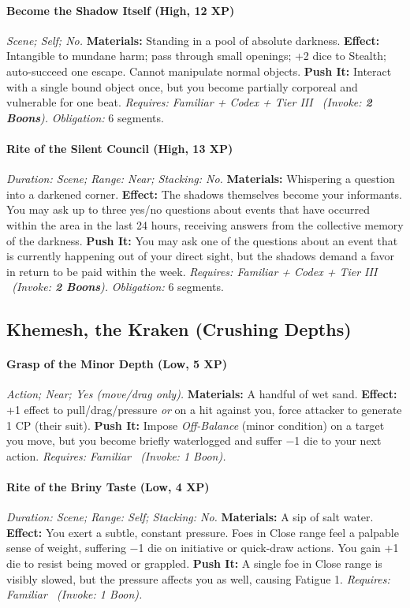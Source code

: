 \paragraph{Become the Shadow Itself (High, 12 XP)} \emph{Scene; Self; No.}
\textbf{Materials:} Standing in a pool of absolute darkness.
\textbf{Effect:} Intangible to mundane harm; pass through small openings; +2 dice to Stealth; auto-succeed one escape. Cannot manipulate normal objects.
\textbf{Push It:} Interact with a single bound object once, but you become partially corporeal and vulnerable for one beat.
\emph{Requires: Familiar + Codex + Tier III \ (\textit{Invoke:} \textbf{2 Boons}).}
\emph{Obligation:} 6 segments.

\paragraph{Rite of the Silent Council (High, 13 XP)} \emph{Duration: Scene; Range: Near; Stacking: No.}
\textbf{Materials:} Whispering a question into a darkened corner.
\textbf{Effect:} The shadows themselves become your informants. You may ask up to three yes/no questions about events that have occurred within the area in the last 24 hours, receiving answers from the collective memory of the darkness.
\textbf{Push It:} You may ask one of the questions about an event that is currently happening out of your direct sight, but the shadows demand a favor in return to be paid within the week.
\emph{Requires: Familiar + Codex + Tier III \ (\textit{Invoke:} \textbf{2 Boons}).}
\emph{Obligation:} 6 segments.

\subsection{Khemesh, the Kraken (Crushing Depths)}
\paragraph{Grasp of the Minor Depth (Low, 5 XP)} \emph{Action; Near; Yes (move/drag only).}
\textbf{Materials:} A handful of wet sand.
\textbf{Effect:} +1 effect to pull/drag/pressure \emph{or} on a hit against you, force attacker to generate 1 CP (their suit).
\textbf{Push It:} Impose \emph{Off-Balance} (minor condition) on a target you move, but you become briefly waterlogged and suffer −1 die to your next action.
\emph{Requires: Familiar \ (\textit{Invoke:} 1 Boon).}
\paragraph{Rite of the Briny Taste (Low, 4 XP)} \emph{Duration: Scene; Range: Self; Stacking: No.}
\textbf{Materials:} A sip of salt water.
\textbf{Effect:} You exert a subtle, constant pressure. Foes in Close range feel a palpable sense of weight, suffering −1 die on initiative or quick-draw actions. You gain +1 die to resist being moved or grappled.
\textbf{Push It:} A single foe in Close range is visibly slowed, but the pressure affects you as well, causing Fatigue 1.
\emph{Requires: Familiar \ (\textit{Invoke:} 1 Boon).}
